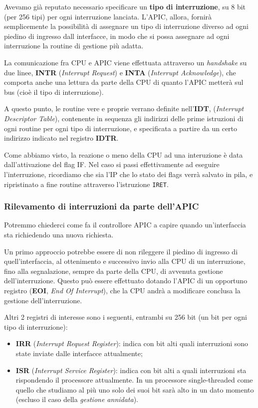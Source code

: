 \documentclass[a4paper,11pt]{article}
\begin{document}
Avevamo già reputato necessario specificare un \textbf{tipo di interruzione}, su 8 bit (per 256 tipi) per ogni interruzione lanciata.
L'APIC, allora, fornirà semplicemente la possibilità di assegnare un tipo di interruzione diverso ad ogni piedino di ingresso dall interfacce, in modo che si possa assegnare ad ogni interruzione la routine di gestione più adatta.

La comunicazione fra CPU e APIC viene effettuata attraverso un \textit{handshake} su due linee, \textbf{INTR} (\textit{Interrupt Request}) e \textbf{INTA} (\textit{Interrupt Acknowledge}), che comporta anche una lettura da parte della CPU di quanto l'APIC metterà sul bus (cioè il tipo di interruzione).

A questo punto, le routine vere e proprie verrano definite nell'\textbf{IDT}, (\textit{Interrupt Descriptor Table}), contenente in sequenza gli indirizzi delle prime istruzioni di ogni routine per ogni tipo di interruzione, e specificata a partire da un certo indirizzo indicato nel registro \textbf{IDTR}.

Come abbiamo visto, la reazione o meno della CPU ad una interuzione è data dall'attivazione del flag IF.
Nel caso si passi effettivamente ad eseguire l'interruzione, ricordiamo che sia l'IP che lo stato dei flags verrà salvato in pila, e ripristinato a fine routine attraverso l'istruzione \lstinline|IRET|.

\subsubsection{Rilevamento di interruzioni da parte dell'APIC}
Potremmo chiederci come fa il controllore APIC a capire quando un'interfaccia sta richiedendo una nuova richiesta.

Un primo approccio potrebbe essere di non rileggere il piedino di ingresso di quell'interfaccia, al ottenimento e successivo invio alla CPU di un interruzione, fino alla segnalazione, sempre da parte della CPU, di avvenuta gestione dell'interruzione.
Questo può essere effettuato dotando l'APIC di un opportuno registro (\textbf{EOI}, \textit{End Of Interrupt}), che la CPU andrà a modificare conclusa la gestione dell'interruzione.

Altri 2 registri di interesse sono i seguenti, entrambi su 256 bit (un bit per ogni tipo di interruzione):
\begin{itemize}
	\item \textbf{IRR} (\textit{Interrupt Request Register}): indica con bit alti quali interruzioni sono state inviate dalle interfacce attualmente;
	\item \textbf{ISR} (\textit{Interrupt Service Register}): indica con bit alti a quali interruzioni sta rispondendo il processore attualmente. In un processore single-threaded come quello che studiamo al più uno solo dei suoi bit sarà alto in un dato momento (escluso il caso della \textit{gestione annidata}).
\end{itemize}
\end{document}
